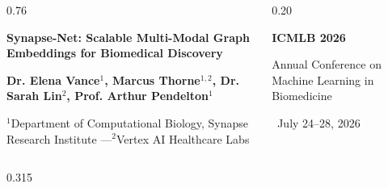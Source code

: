 \documentclass[final]{beamer}
\begin{document}
\begin{frame}[t]

\begin{tcolorbox}[
  enhanced,
  colback=navyprimary,
  colframe=navyprimary,
  arc=0pt,
  boxrule=0pt,
  top=20pt,
  bottom=20pt,
  left=25pt,
  right=25pt
]
  \begin{columns}[c]
    \begin{column}{0.76\textwidth}
      {\color{white}\Huge \bfseries Synapse-Net: Scalable Multi-Modal Graph Embeddings for Biomedical Discovery \par}
      \vspace{12pt}
      {\color{tealaccent}\Large \bfseries Dr. Elena Vance$^{1}$, Marcus Thorne$^{1,2}$, Dr. Sarah Lin$^{2}$, Prof. Arthur Pendelton$^{1}$ \par}
      \vspace{8pt}
      {\color{gray!30}\large $^{1}$Department of Computational Biology, Synapse Research Institute \quad---\quad $^{2}$Vertex AI Healthcare Labs \par}
    \end{column}
    \begin{column}{0.20\textwidth}
      \begin{tcolorbox}[
        colback=white!10,
        colframe=tealaccent,
        arc=6pt,
        boxrule=1pt,
        halign=center
      ]
        {\color{white}\bfseries \Large ICMLB 2026 \par}
        \vspace{4pt}
        {\color{tealaccent}\small Annual Conference on Machine Learning in Biomedicine \par}
        \vspace{4pt}
        {\color{gray!30}\footnotesize \faCalendar\ July 24--28, 2026 \par}
      \end{tcolorbox}
    \end{column}
  \end{columns}
\end{tcolorbox}

\vspace{15pt}

\begin{columns}[t]

  \begin{column}{0.315\textwidth}


\end{column}
\end{columns}
\end{frame}
\end{document}
